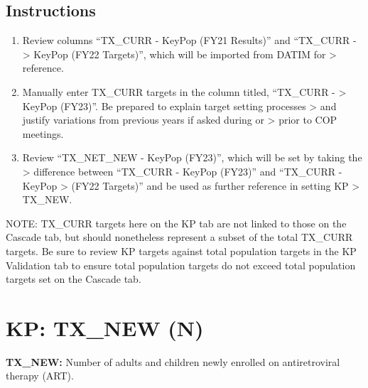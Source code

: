 \documentclass[
  openany]{book}
\begin{document}
\hypertarget{instructions-36}{%
\subsection{Instructions}\label{instructions-36}}

\begin{enumerate}
\def\labelenumi{\arabic{enumi}.}
\item
  Review columns ``TX\_CURR - KeyPop (FY21 Results)'' and ``TX\_CURR - \textgreater{}
  KeyPop (FY22 Targets)'', which will be imported from DATIM for \textgreater{}
  reference.
\item
  Manually enter TX\_CURR targets in the column titled, ``TX\_CURR - \textgreater{}
  KeyPop (FY23)''. Be prepared to explain target setting processes \textgreater{}
  and justify variations from previous years if asked during or \textgreater{}
  prior to COP meetings.
\item
  Review ``TX\_NET\_NEW - KeyPop (FY23)'', which will be set by taking
  the \textgreater{} difference between ``TX\_CURR - KeyPop (FY23)'' and ``TX\_CURR -
  KeyPop \textgreater{} (FY22 Targets)'' and be used as further reference in setting
  KP \textgreater{} TX\_NEW.
\end{enumerate}

NOTE: TX\_CURR targets here on the KP tab are not linked to those on the
Cascade tab, but should nonetheless represent a subset of the total
TX\_CURR targets. Be sure to review KP targets against total population
targets in the KP Validation tab to ensure total population targets do
not exceed total population targets set on the Cascade tab.

\hypertarget{kp-tx_new-n}{%
\section{KP: TX\_NEW (N)}\label{kp-tx_new-n}}

\textbf{TX\_NEW:} Number of adults and children newly enrolled on
antiretroviral therapy (ART).
\end{document}
